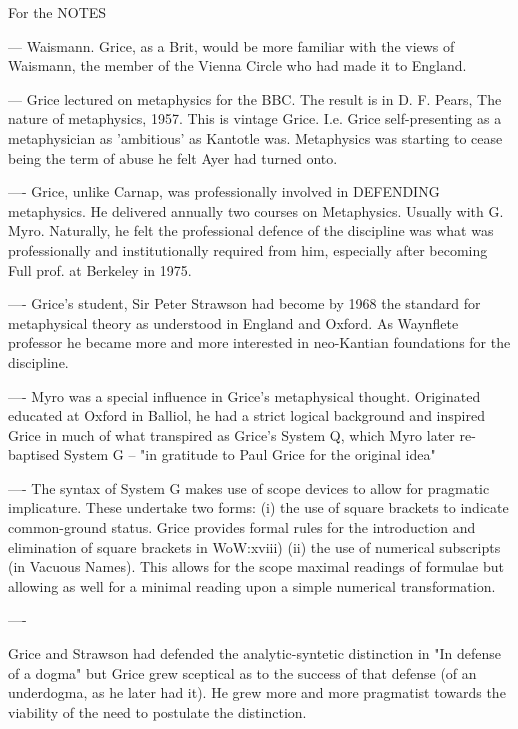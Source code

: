 \documentclass[10pt,titlepage]{book}
\begin{document}
{ 
For the NOTES
 
 
--- Waismann. Grice, as a Brit, would be more familiar with the views of  
Waismann, the member of the Vienna Circle who had made it to England. 
 
--- Grice lectured on metaphysics for the BBC. The result is in D. F.  
Pears, The nature of metaphysics, 1957. This is vintage Grice. I.e. Grice  
self-presenting as a metaphysician as 'ambitious' as Kantotle was. Metaphysics  
was starting to cease being the term of abuse he felt Ayer had turned  onto.

  
---- Grice, unlike Carnap, was professionally involved in DEFENDING  
metaphysics. He delivered annually two courses on Metaphysics. Usually with G.  
Myro. Naturally, he felt the professional defence of the discipline was what 
was  professionally and institutionally required from him, especially after 
becoming  Full prof. at Berkeley in 1975. 
 
---- Grice's student, Sir Peter Strawson had become by 1968 the standard  
for metaphysical theory as understood in England and Oxford. As Waynflete  
professor he became more and more interested in neo-Kantian foundations for 
the  discipline.
 
---- Myro was a special influence in Grice's metaphysical thought.  
Originated educated at Oxford in Balliol, he had a strict logical background and  
inspired Grice in much of what transpired as Grice's System Q, which Myro 
later  re-baptised System G -- "in gratitude to Paul Grice for the original 
idea"
 
---- The syntax of System G makes use of scope devices to allow for  
pragmatic implicature. These undertake two forms:
(i) the use of square brackets to indicate common-ground status. Grice  
provides formal rules for the introduction and elimination of square brackets 
in  WoW:xviii)
(ii) the use of numerical subscripts (in Vacuous Names). This allows for  
the scope maximal readings of formulae but allowing as well for a minimal  
reading upon a simple numerical transformation. 
 
----
 
Grice and Strawson had defended the analytic-syntetic distinction in "In  
defense of a dogma" but Grice grew sceptical as to the success of that 
defense  (of an underdogma, as he later had it). He grew more and more pragmatist 
towards  the viability of the need to postulate the distinction.
 
}
\end{document}
